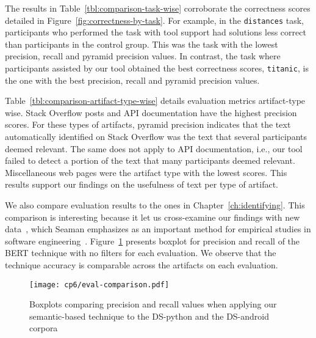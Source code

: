 The results in Table~\ref{tbl:comparison-task-wise} corroborate 
the correctness scores detailed in Figure~\ref{fig:correctness-by-task}. For example, 
in the \texttt{distances} task, participants who performed the task with tool support had solutions less correct than participants in the control group.
This was the task with the lowest precision, recall and pyramid precision values. 
In contrast, the task where participants assisted by our tool obtained the best correctness scores, \texttt{titanic}, is the one with the best precision, recall and pyramid precision values.








Table~\ref{tbl:comparison-artifact-type-wise} details evaluation metrics artifact-type wise. 
Stack Overflow posts and API documentation have the highest precision scores. For these types of artifacts, pyramid precision indicates that the 
text automatically identified on Stack Overflow was the text that several participants deemed relevant. 
The same does not apply to API documentation, i.e., our tool failed to detect a portion of the text that many participants deemed relevant. 
Miscellaneous web pages were the artifact type with the lowest scores. This results support our findings 
on the usefulness of text per type of artifact.






We also compare evaluation results to the ones in Chapter~\ref{ch:identifying}. 
This comparison is interesting because it let us cross-examine our findings with new data~\cite{easterbrook2008},
which Seaman emphasizes as an important method for empirical studies in software engineering~\cite{Seaman1999}.
Figure~\ref{fig:eval-comparison} presents boxplot for precision and recall of the BERT technique with no filters 
for each evaluation. We observe that the technique accuracy is comparable across the artifacts on each evaluation. 







\medskip
\begin{figure}
    \centering
    \texttt{[image: cp6/eval-comparison.pdf]}
    \caption{Boxplots comparing precision and recall values when applying our semantic-based technique to the \acs{DS-python} and the \acs{DS-android} corpora}
    \label{fig:eval-comparison}
\end{figure}


\clearpage
